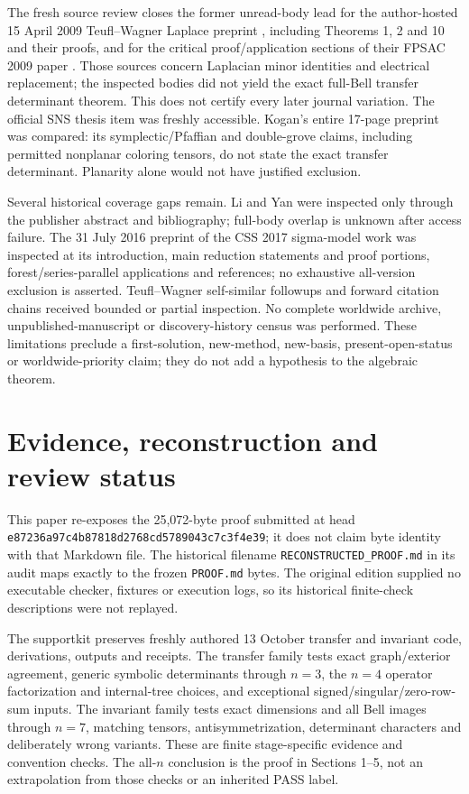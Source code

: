 \documentclass[11pt]{article}
\begin{document}
The fresh source review closes the former unread-body lead for the author-hosted 15 April 2009 Teufl--Wagner Laplace preprint \cite{TWLaplace}, including Theorems 1, 2 and 10 and their proofs, and for the critical proof/application sections of their FPSAC 2009 paper \cite{TWFPSAC}. Those sources concern Laplacian minor identities and electrical replacement; the inspected bodies did not yield the exact full-Bell transfer determinant theorem. This does not certify every later journal variation. The official SNS thesis item was freshly accessible. Kogan's entire 17-page preprint \cite{Kogan} was compared: its symplectic/Pfaffian and double-grove claims, including permitted nonplanar coloring tensors, do not state the exact transfer determinant. Planarity alone would not have justified exclusion.

Several historical coverage gaps remain. Li and Yan \cite{LiYan} were inspected only through the publisher abstract and bibliography; full-body overlap is unknown after access failure. The 31 July 2016 preprint of the CSS 2017 sigma-model work \cite{CSS2017} was inspected at its introduction, main reduction statements and proof portions, forest/series-parallel applications and references; no exhaustive all-version exclusion is asserted. Teufl--Wagner self-similar followups and forward citation chains received bounded or partial inspection. No complete worldwide archive, unpublished-manuscript or discovery-history census was performed. These limitations preclude a first-solution, new-method, new-basis, present-open-status or worldwide-priority claim; they do not add a hypothesis to the algebraic theorem.

\section{Evidence, reconstruction and review status}
This paper re-exposes the 25,072-byte proof submitted at head \texttt{e87236a97c4b87818d2768cd5789043c7c3f4e39}; it does not claim byte identity with that Markdown file. The historical filename \texttt{RECONSTRUCTED\_PROOF.md} in its audit maps exactly to the frozen \texttt{PROOF.md} bytes. The original edition supplied no executable checker, fixtures or execution logs, so its historical finite-check descriptions were not replayed.

The supportkit preserves freshly authored 13 October transfer and invariant code, derivations, outputs and receipts. The transfer family tests exact graph/exterior agreement, generic symbolic determinants through $n=3$, the $n=4$ operator factorization and internal-tree choices, and exceptional signed/singular/zero-row-sum inputs. The invariant family tests exact dimensions and all Bell images through $n=7$, matching tensors, antisymmetrization, determinant characters and deliberately wrong variants. These are finite stage-specific evidence and convention checks. The all-$n$ conclusion is the proof in Sections 1--5, not an extrapolation from those checks or an inherited PASS label.
\end{document}
